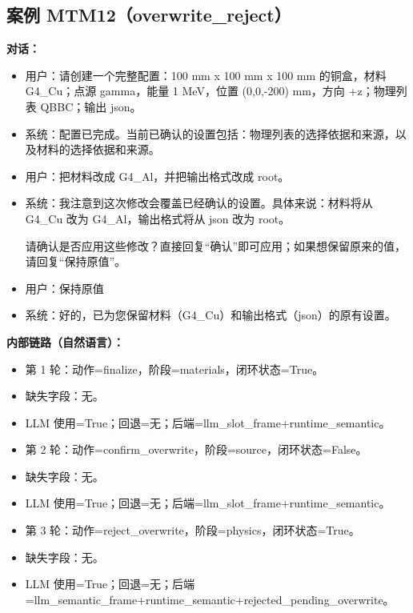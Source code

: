 \documentclass[11pt]{ctexart}
\begin{document}
\subsection{案例 MTM12（overwrite\_reject）}
\textbf{对话：}
\begin{itemize}
\item 用户：请创建一个完整配置：100 mm x 100 mm x 100 mm 的铜盒，材料 G4\_Cu；点源 gamma，能量 1 MeV，位置 (0,0,-200) mm，方向 +z；物理列表 QBBC；输出 json。
\item 系统：配置已完成。当前已确认的设置包括：物理列表的选择依据和来源，以及材料的选择依据和来源。
\item 用户：把材料改成 G4\_Al，并把输出格式改成 root。
\item 系统：我注意到这次修改会覆盖已经确认的设置。具体来说：材料将从 G4\_Cu 改为 G4\_Al，输出格式将从 json 改为 root。

请确认是否应用这些修改？直接回复“确认”即可应用；如果想保留原来的值，请回复“保持原值”。
\item 用户：保持原值
\item 系统：好的，已为您保留材料（G4\_Cu）和输出格式（json）的原有设置。
\end{itemize}
\textbf{内部链路（自然语言）：}
\begin{itemize}
\item 第 1 轮：动作=finalize，阶段=materials，闭环状态=True。
\item 缺失字段：无。
\item LLM 使用=True；回退=无；后端=llm\_slot\_frame+runtime\_semantic。
\item 第 2 轮：动作=confirm\_overwrite，阶段=source，闭环状态=False。
\item 缺失字段：无。
\item LLM 使用=True；回退=无；后端=llm\_slot\_frame+runtime\_semantic。
\item 第 3 轮：动作=reject\_overwrite，阶段=physics，闭环状态=True。
\item 缺失字段：无。
\item LLM 使用=True；回退=无；后端=llm\_semantic\_frame+runtime\_semantic+rejected\_pending\_overwrite。
\end{itemize}
\end{document}
